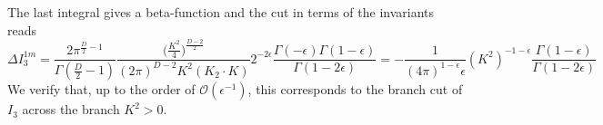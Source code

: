\fi
%
The last integral gives a beta-function and the cut in terms of the invariants reads
\begin{equation}
\Delta I_3^{1m} = 
\frac{2\pi^{\frac{D}{2}-1}}{\Gamma(\frac{D}{2}-1)}\frac{\big(\frac{K^2}{4}\big)^{\frac{D-2}{2}}}{(2\pi)^{D-2}K^2(K_2\cdot K)} 2^{-2\epsilon}\frac{\Gamma(-\epsilon)\Gamma(1-\epsilon)}{\Gamma(1-2\epsilon)}
=
-\frac{1}{(4\pi)^{1 - \epsilon}\epsilon}(K^{2})^{-1-\epsilon}\frac{\Gamma(1-\epsilon)}{\Gamma(1-2\epsilon)}
\end{equation}
We verify that, up to the order of $\mathcal{O}(\epsilon^{-1})$, this corresponds to the branch cut of $I_3$ across the branch $K^2 > 0$.